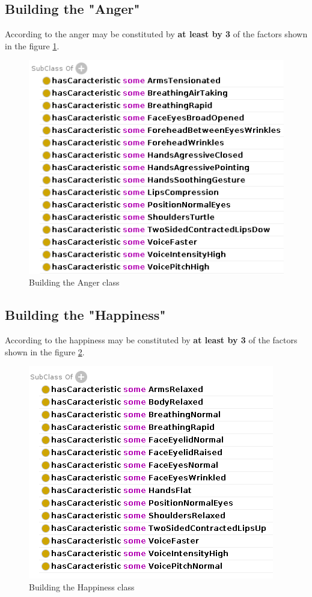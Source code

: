\documentclass[conference]{IEEEtran}
\begin{document}
\subsection{Building the "Anger"}
According to \cite{ekman2001telling} the anger may be constituted by \textbf{at least by 3} of the factors shown in the figure \ref{fig:anger}.
\begin{figure}[bpht]
	\centering
	\includegraphics[width=0.7\linewidth]{anger}
	\caption{Building the Anger class}
	\label{fig:anger}
\end{figure}

\subsection{Building the "Happiness"}
According to \cite{ekman2001telling} the happiness may be constituted by \textbf{at least by 3} of the factors shown in the figure \ref{fig:happiness}.
\begin{figure}[bpht]
	\centering
	\includegraphics[width=0.7\linewidth]{happiness.png}
	\caption{Building the Happiness class}
	\label{fig:happiness}
\end{figure}
\end{document}
